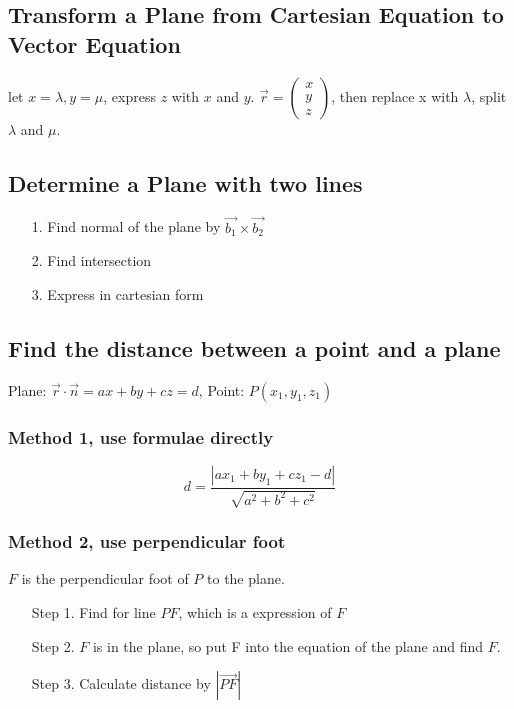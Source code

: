 \documentclass[a4paper,9pt]{scrartcl}
\newcommand{\vecabs}[1]{\left| \vec{#1} \right|}
\newcommand{\abs}[1]{\left| #1 \right|}
\begin{document}
    \subsection{Transform a Plane from Cartesian Equation to Vector Equation}
    let $x = \lambda, y=\mu$,
    express $z$ with $x$ and $y$.
    $\vec{r}=\begin{pmatrix}
                 x\\y\\z
    \end{pmatrix}$,
    then replace x with $\lambda$, split $\lambda$ and $\mu$.

    \subsection{Determine a Plane with two lines}
    \begin{itemize}
        \item [1.] Find normal of the plane by $\vec{b_1}\times\vec{b_2}$
        \item [2.] Find intersection
        \item [3.] Express in cartesian form
    \end{itemize}

    \subsection{Find the distance between a point and a plane}
    Plane: $\vec{r}\cdot\vec{n} = ax +by+cz=d$,
    Point: $P(x_1,y_1,z_1)$

    \subsubsection{Method 1, use formulae directly}
    \begin{displaymath}
        d = \frac{\abs{ax_1+by_1+cz_1-d}}{\sqrt{a^2+b^2+c^2}}
    \end{displaymath}

    \subsubsection{Method 2, use perpendicular foot}

    $F$ is the perpendicular foot of $P$ to the plane.

    \begin{itemize}
        \item [Step 1.] Find  for line $PF$, which is a expression of $F$
        \item [Step 2.] $F$ is in the plane, so put F into the equation of the plane and find $F$.
        \item [Step 3.] Calculate distance by $\vecabs{PF}$
    \end{itemize}
\end{document}
